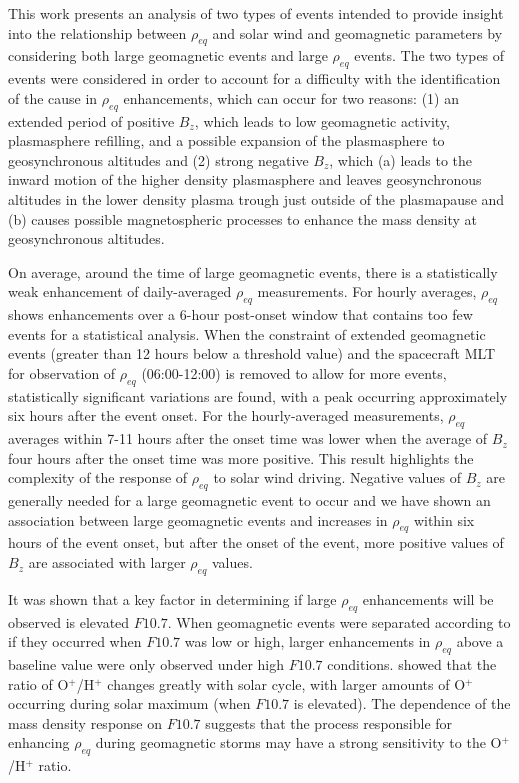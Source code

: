\documentclass[12pt]{article}
\begin{document}
This work presents an analysis of two types of events intended to provide insight into the relationship between $\rho_{eq}$ and solar wind and geomagnetic parameters by considering both large geomagnetic events and large $\rho_{eq}$ events.  The two types of events were considered in order to account for a difficulty with the identification of the cause in $\rho_{eq}$ enhancements, which can occur for two reasons: (1) an extended period of positive $B_z$, which leads to low geomagnetic activity, plasmasphere refilling, and a possible expansion of the plasmasphere to geosynchronous altitudes and (2) strong negative $B_z$, which (a) leads to the inward motion of the higher density plasmasphere and leaves geosynchronous altitudes in the lower density plasma trough just outside of the plasmapause and (b) causes possible magnetospheric processes to enhance the mass density at geosynchronous altitudes.

On average, around the time of large geomagnetic events, there is a statistically weak enhancement of daily-averaged $\rho_{eq}$ measurements. For hourly averages, $\rho_{eq}$ shows enhancements over a 6-hour post-onset window that contains too few events for a statistical analysis.  When the constraint of extended geomagnetic events (greater than 12 hours below a threshold value) and the spacecraft MLT for observation of $\rho_{eq}$ (06:00-12:00) is removed to allow for more events, statistically significant variations are found, with a peak occurring approximately six hours after the event onset.  For the hourly-averaged measurements, $\rho_{eq}$ averages within 7-11 hours after the onset time was lower when the average of $B_{z}$ four hours after the onset time was more positive.  This result highlights the complexity of the response of $\rho_{eq}$ to solar wind driving.  Negative values of $B_{z}$ are generally needed for a large geomagnetic event to occur and we have shown an association between large geomagnetic events and increases in $\rho_{eq}$ within six hours of the event onset, but after the onset of the event, more positive values of $B_z$ are associated with larger $\rho_{eq}$ values.  


It was shown that a key factor in determining if large $\rho_{eq}$ enhancements will be observed is elevated $F10.7$.  When geomagnetic events were separated according to if they occurred when $F10.7$ was low or high, larger enhancements in $\rho_{eq}$ above a baseline value were only observed under high $F10.7$ conditions.  \cite{Denton2016} showed that the ratio of O$^+$/H$^+$ changes greatly with solar cycle, with larger amounts of O$^+$ occurring during solar maximum (when $F10.7$ is elevated).  The dependence of the mass density response on $F10.7$ suggests that the process responsible for enhancing $\rho_{eq}$ during geomagnetic storms may have a strong sensitivity to the O$^+$/H$^+$ ratio.
\end{document}
